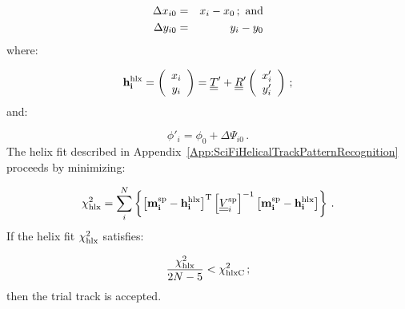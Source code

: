 \begin{eqnarray}
  \Delta x_{i0} & = & x_i - x_0 \, ; {\rm~and}  \\
  \Delta y_{i0} & = & y_i - y_0
\end{eqnarray}
where:

\begin{equation}
  {\bf h^{\rm hlx}_i} = 
  \left(
      \begin{array}{cc}
         x_i                                                       \\
         y_i
      \end{array}
  \right)                 =
  \underline{\underline{T}}' + \underline{\underline{R}}'
  \left(
      \begin{array}{cc}
         x'_i                                                      \\
         y'_i
      \end{array}
  \right) \, ;
\end{equation}
and:

\begin{equation}
  \phi'_i = \phi_0 + \Delta \Psi_{i0} \, .
\end{equation}
The helix fit described in Appendix~\ref{App:SciFiHelicalTrackPatternRecognition} proceeds by minimizing:

\begin{equation}
  \chi^2_{\rm hlx} = 
    \sum_i^N \left\{
      \left[ {\bf m^{\rm sp}_i} - {\bf h^{\rm hlx}_i} \right]^{\rm T}
      \left[ \underline{\underline{V}}^{\rm sp}_i \right]^{-1}
      \left[ {\bf m^{\rm sp}_i} - {\bf h^{\rm hlx}_i} \right] 
  \right\}\, .
\end{equation}
If the helix fit $\chi^2_{\rm hlx}$ satisfies:

\begin{equation}
  \frac{\chi^2_{\rm hlx}}{2N-5} < \chi^2_{\rm hlx C} \, ;
\end{equation}
then the trial track is accepted.
